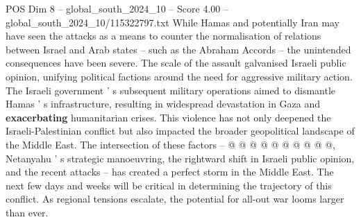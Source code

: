 \begin{textsample}{POS Dim 8 – global\_south\_2024\_10 – Score 4.00 – global\_south\_2024\_10/115322797.txt}
While Hamas and potentially Iran may have seen the attacks as a means to counter the normalisation of relations between Israel and Arab states -- such as the Abraham Accords -- the unintended consequences have been severe.
The scale of the assault galvanised Israeli public opinion, unifying political factions around the need for aggressive military action.
The Israeli government ' s subsequent military operations aimed to dismantle Hamas ' s infrastructure, resulting in widespread devastation in Gaza and \textbf{exacerbating} humanitarian crises.
This violence has not only deepened the Israeli-Palestinian conflict but also impacted the broader geopolitical landscape of the Middle East.
The intersection of these factors -- @ @ @ @ @ @ @ @ @ @, Netanyahu ' s strategic manoeuvring, the rightward shift in Israeli public opinion, and the recent attacks -- has created a perfect storm in the Middle East.
The next few days and weeks will be critical in determining the trajectory of this conflict.
As regional tensions escalate, the potential for all-out war looms larger than ever.

\end{textsample}
